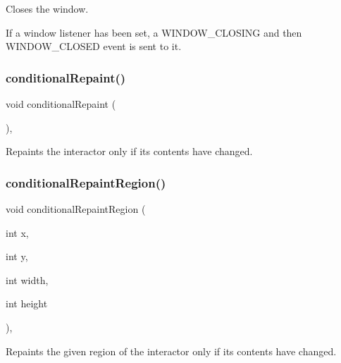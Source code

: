 Closes the window. 

If a window listener has been set, a W\+I\+N\+D\+O\+W\+\_\+\+C\+L\+O\+S\+I\+NG and then W\+I\+N\+D\+O\+W\+\_\+\+C\+L\+O\+S\+ED event is sent to it. \mbox{\label{classGDrawingSurface_a221b3e75bb3d9d0bfea62b3364e6773b}} 
\subsubsection{\texorpdfstring{conditional\+Repaint()}{conditionalRepaint()}}
{\footnotesize\ttfamily void conditional\+Repaint (\begin{DoxyParamCaption}{ }\end{DoxyParamCaption})\hspace{0.3cm}{\ttfamily [virtual]}, {\ttfamily [inherited]}}



Repaints the interactor only if its contents have changed. 

\mbox{\label{classGDrawingSurface_aedd4b792311d946eeaf44b0de337a408}} 
\subsubsection{\texorpdfstring{conditional\+Repaint\+Region()}{conditionalRepaintRegion()}\hspace{0.1cm}{\footnotesize\ttfamily [1/2]}}
{\footnotesize\ttfamily void conditional\+Repaint\+Region (\begin{DoxyParamCaption}\item[{int}]{x,  }\item[{int}]{y,  }\item[{int}]{width,  }\item[{int}]{height }\end{DoxyParamCaption})\hspace{0.3cm}{\ttfamily [virtual]}, {\ttfamily [inherited]}}



Repaints the given region of the interactor only if its contents have changed. 

\mbox{\label{classGDrawingSurface_a3932a12278752db368e24fa404e446aa}} 
